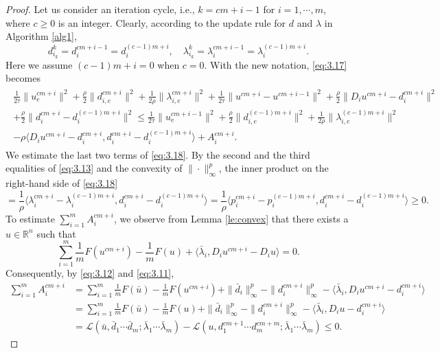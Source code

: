 \documentclass{article}
\theoremstyle{definition}
\begin{document}
\begin{proof}
Let us consider an iteration cycle, i.e., $k=cm+i-1$ for $i=1,\cdots,m$, where $c\geq 0$ is an integer.
Clearly, according to the update rule for $d$ and $\lambda$ in Algorithm \ref{alg1},
\[
d_{i_k}^k=d_{i}^{cm+i-1}=d_{i}^{(c-1)m+i},\quad
\lambda_{i_k}^k=\lambda_{i}^{cm+i-1}=\lambda_{i}^{(c-1)m+i}.
\]
Here we assume $(c-1)m+i=0$ when $c=0$.
With the new notation, \eqref{eq:3.17} becomes
\begin{align}\label{eq:3.18}
\begin{split}
  \frac{1}{2\tau}\|u_e^{cm+i}\|^2 +\frac{\rho}{2}\|d_{i,e}^{cm+i}\|^2
  + \frac{1}{2\rho}\|\lambda^{cm+i}_{i,e}\|^2
  +\frac{1}{2\tau}\|u^{cm+i}-u^{cm+i-1}\|^2
  +\frac{\rho}{2}\|D_{i}u^{cm+i}-d_{i}^{cm+i}\|^2 \\
  +\frac{\rho}{2}\|d_{i}^{cm+i}-d_{i}^{(c-1)m+i}\|^2
  \leq \frac{1}{2\tau}\|u_e^{cm+i-1}\|^2 +\frac{\rho}{2}\|d_{i,e}^{(c-1)m+i}\|^2
  +\frac{1}{2\rho}\|\lambda^{(c-1)m+i}_{i,e}\|^2\\
  -\rho\langle D_{i}u^{cm+i}-d_{i}^{cm+i}, d_{i}^{cm+i}-d_{i}^{(c-1)m+i}\rangle
  +A_i^{cm+i}.
\end{split}
\end{align}
We estimate the last two terms of \eqref{eq:3.18}.
By the second and the third equalities of \eqref{eq:3.13} and the convexity of $\|\cdot\|_\infty^p$, the inner product on the right-hand side of \eqref{eq:3.18}
\[
=\frac{1}{\rho}\langle \lambda_i^{cm+i}-\lambda_i^{(c-1)m+i}, d_{i}^{cm+i}-d_{i}^{(c-1)m+i}\rangle
=\frac{1}{\rho}\langle p_i^{cm+i}-p_i^{(c-1)m+i}, d_{i}^{cm+i}-d_{i}^{(c-1)m+i}\rangle
\geq 0.
\]
To estimate $\sum_{i=1}^{m} A_i^{cm+i}$,
we observe from Lemma \ref{le:convex} that there exists a $u\in\mathbb{R}^n$ such that
\[
\sum_{i=1}^{m}
\frac{1}{m}F(u^{cm+i})
-\frac{1}{m}F(u)
+\langle \bar{\lambda}_{i}, D_{i}u^{cm+i}-D_{i}u \rangle
=0.
\]
Consequently, by \eqref{eq:3.12} and \eqref{eq:3.11},
\begin{align*}
 \sum_{i=1}^{m} A_i^{cm+i}
 &=\sum_{i=1}^{m}\frac{1}{m}F(\bar{u})-\frac{1}{m}F(u^{cm+i})
   +\|\bar{d}_{i}\|_\infty^p - \|d_{i}^{cm+i}\|_\infty^p
   - \langle \bar{\lambda}_{i}, D_{i}u^{cm+i}-d_{i}^{cm+i} \rangle\\
&=\sum_{i=1}^{m}\frac{1}{m}F(\bar{u})-\frac{1}{m}F(u)
   +\|\bar{d}_{i}\|_\infty^p - \|d_{i}^{cm+i}\|_\infty^p
   - \langle \bar{\lambda}_{i}, D_{i}u-d_{i}^{cm+i} \rangle\\
   &=\mathcal{L}(\bar{u},\bar{d}_1\cdots \bar{d}_m;\bar{\lambda}_1\cdots \bar{\lambda}_m)
  - \mathcal{L}({u},{d}_1^{cm+1} \cdots {d}_m^{cm+m};\bar{\lambda}_1\cdots \bar{\lambda}_m)
  \leq 0.
\end{align*}


\end{proof}
\end{document}
